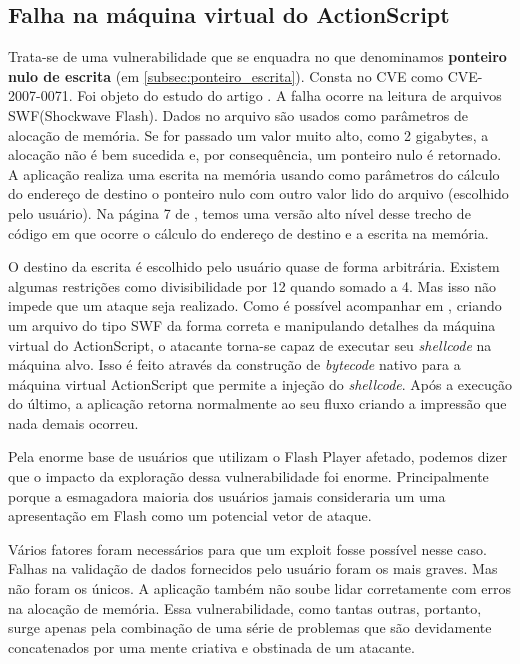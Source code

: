 		\subsection{Falha na máquina virtual do ActionScript}
			Trata-se de uma vulnerabilidade que se enquadra no que denominamos \textbf{ponteiro nulo de escrita} (em 
			\ref{subsec:ponteiro_escrita}).
			Consta no CVE como CVE-2007-0071. Foi objeto do estudo do artigo \cite{Dowd2008}.
			A falha ocorre na leitura de arquivos SWF(Shockwave Flash). Dados no arquivo são usados
			como parâmetros de alocação de memória. Se for passado um valor muito alto, como 2 gigabytes,
			a alocação não é bem sucedida e, por consequência, um ponteiro nulo é retornado.
			A aplicação realiza uma escrita na memória usando como parâmetros do cálculo do endereço de destino
			o ponteiro nulo com outro valor lido do arquivo (escolhido pelo usuário).
			Na página 7 de \cite{Dowd2008}, temos uma versão alto nível desse trecho de código
			em que ocorre o cálculo do endereço de destino e a escrita na memória.


			O destino da escrita é escolhido pelo usuário quase de forma arbitrária. Existem algumas restrições
			como divisibilidade por 12 quando somado a 4. Mas isso não impede que um ataque seja realizado.
			Como é possível acompanhar em \cite{Dowd2008}, criando um arquivo do tipo SWF da forma
			correta e manipulando detalhes da máquina virtual do ActionScript, o atacante torna-se
			capaz de executar seu \textsl{shellcode} na máquina alvo. Isso é feito através da construção
			de \textsl{bytecode} nativo para a máquina virtual ActionScript que permite a injeção do \textsl{shellcode}.
			Após a execução do último, a aplicação retorna normalmente ao seu fluxo criando a impressão que
			nada demais ocorreu.

			
			Pela enorme base de usuários que utilizam o Flash Player afetado, podemos dizer
			que o impacto da exploração dessa vulnerabilidade foi enorme.
			Principalmente porque a esmagadora maioria dos usuários jamais consideraria um
			uma apresentação em Flash como um potencial vetor de ataque.

			
			Vários fatores foram necessários para que um exploit fosse possível nesse caso.
			Falhas na validação de dados fornecidos pelo usuário foram os mais graves.
			Mas não foram os únicos. A aplicação também não soube lidar corretamente com erros
			na alocação de memória. Essa vulnerabilidade, como tantas outras, portanto, surge
			apenas pela combinação de uma série de problemas que são devidamente concatenados
			por uma mente criativa e obstinada de um atacante.
						
